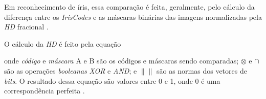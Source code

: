 \par Em reconhecimento de íris, essa comparação é feita, geralmente, pelo cálculo da diferença entre os \textit{IrisCodes} e as máscaras binárias das imagens normalizadas pela \textit{\acrfull{HD}} fracional \cite{daugman2004}.



\par O cálculo da \textit{\acrshort{HD}} é feito pela equação


\noindent onde \textit{código} e \textit{máscara} A e B são os códigos e máscaras sendo comparadas; $\otimes$ e $\cap$ são as operações \textit{booleanas} \textit{XOR} e \textit{AND}; e $\| \|$ são as normas dos vetores de \textit{bits}. O resultado dessa equação são valores entre 0 e 1, onde 0 é uma correspondência perfeita \cite{daugman2004}.



